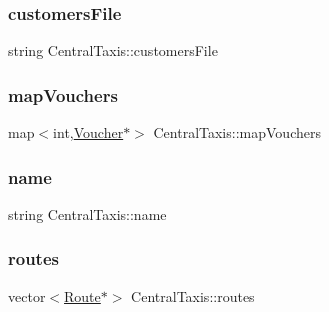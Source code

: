 \hypertarget{classCentralTaxis_a658c8ac7923a5f759da1545a21416532}{}\label{classCentralTaxis_a658c8ac7923a5f759da1545a21416532} 
\subsubsection{\texorpdfstring{customers\+File}{customersFile}}
{\footnotesize\ttfamily string Central\+Taxis\+::customers\+File\hspace{0.3cm}{\ttfamily [private]}}

\hypertarget{classCentralTaxis_a3213a25703a7791fda679f93de0ff652}{}\label{classCentralTaxis_a3213a25703a7791fda679f93de0ff652} 
\subsubsection{\texorpdfstring{map\+Vouchers}{mapVouchers}}
{\footnotesize\ttfamily map$<$int,\hyperlink{classVoucher}{Voucher}$\ast$$>$ Central\+Taxis\+::map\+Vouchers\hspace{0.3cm}{\ttfamily [private]}}

\hypertarget{classCentralTaxis_ab651d92a544bb7910586183aef0b5ff6}{}\label{classCentralTaxis_ab651d92a544bb7910586183aef0b5ff6} 
\subsubsection{\texorpdfstring{name}{name}}
{\footnotesize\ttfamily string Central\+Taxis\+::name\hspace{0.3cm}{\ttfamily [private]}}

\hypertarget{classCentralTaxis_aefebf92c6b447639524856f919b8736f}{}\label{classCentralTaxis_aefebf92c6b447639524856f919b8736f} 
\subsubsection{\texorpdfstring{routes}{routes}}
{\footnotesize\ttfamily vector$<$\hyperlink{classRoute}{Route}$\ast$$>$ Central\+Taxis\+::routes\hspace{0.3cm}{\ttfamily [private]}}

